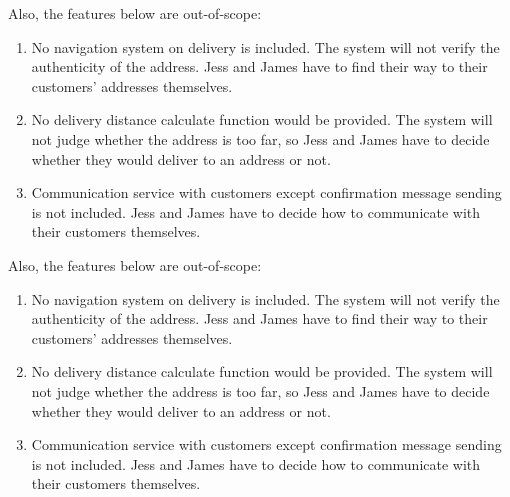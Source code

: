 \documentclass{report}
\begin{document}
Also, the features below are out-of-scope:
\begin{enumerate}
  \item No navigation system on delivery is included. The system will not verify the authenticity of the address. Jess and James have to find their way to their customers' addresses themselves.
  \item No delivery distance calculate function would be provided. The system will not judge whether the address is too far, so Jess and James have to decide whether they would deliver to an address or not.
  \item Communication service with customers except confirmation message sending is not included. Jess and James have to decide how to communicate with their customers themselves.
\end{enumerate}

Also, the features below are out-of-scope:
\begin{enumerate}
  \item No navigation system on delivery is included. The system will not verify the authenticity of the address. Jess and James have to find their way to their customers' addresses themselves.
  \item No delivery distance calculate function would be provided. The system will not judge whether the address is too far, so Jess and James have to decide whether they would deliver to an address or not. 
  \item Communication service with customers except confirmation message sending is not included. Jess and James have to decide how to communicate with their customers themselves.
\end{enumerate}
\end{document}
